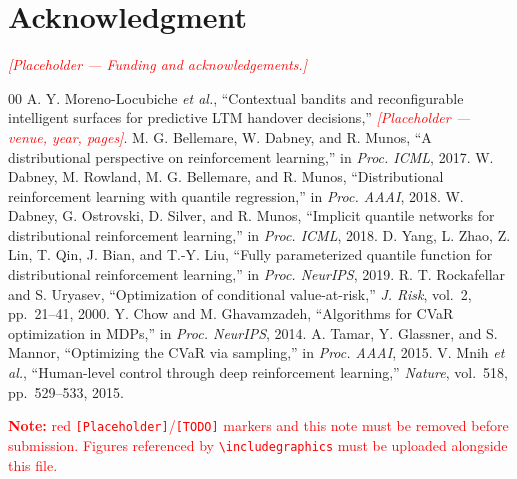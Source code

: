 \documentclass[conference]{IEEEtran}
\newcommand{\PLACEHOLDER}[1]{\textcolor{red}{\textit{[Placeholder --- #1]}}}
\begin{document}
\section*{Acknowledgment}
\PLACEHOLDER{Funding and acknowledgements.}

\begin{thebibliography}{00}
 A. Y. Moreno-Locubiche \emph{et al.}, ``Contextual bandits and reconfigurable intelligent surfaces for predictive LTM handover decisions,'' \PLACEHOLDER{venue, year, pages}.
 M. G. Bellemare, W. Dabney, and R. Munos, ``A distributional perspective on reinforcement learning,'' in \emph{Proc. ICML}, 2017.
 W. Dabney, M. Rowland, M. G. Bellemare, and R. Munos, ``Distributional reinforcement learning with quantile regression,'' in \emph{Proc. AAAI}, 2018.
 W. Dabney, G. Ostrovski, D. Silver, and R. Munos, ``Implicit quantile networks for distributional reinforcement learning,'' in \emph{Proc. ICML}, 2018.
 D. Yang, L. Zhao, Z. Lin, T. Qin, J. Bian, and T.-Y. Liu, ``Fully parameterized quantile function for distributional reinforcement learning,'' in \emph{Proc. NeurIPS}, 2019.
 R. T. Rockafellar and S. Uryasev, ``Optimization of conditional value-at-risk,'' \emph{J. Risk}, vol.~2, pp.~21--41, 2000.
 Y. Chow and M. Ghavamzadeh, ``Algorithms for CVaR optimization in MDPs,'' in \emph{Proc. NeurIPS}, 2014.
 A. Tamar, Y. Glassner, and S. Mannor, ``Optimizing the CVaR via sampling,'' in \emph{Proc. AAAI}, 2015.
 V. Mnih \emph{et al.}, ``Human-level control through deep reinforcement learning,'' \emph{Nature}, vol.~518, pp.~529--533, 2015.
\end{thebibliography}

\vspace{6pt}
\textcolor{red}{\textbf{Note:} red \texttt{[Placeholder]}/\texttt{[TODO]} markers and this note must be removed before submission. Figures referenced by \texttt{\textbackslash includegraphics} must be uploaded alongside this file.}
\end{document}
